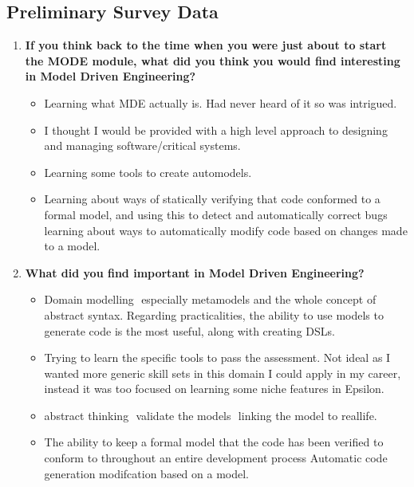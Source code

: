 \documentclass[12pt, a4paper]{report} \usepackage[titletoc]{appendix}
\begin{document}
\begin{appendices}
\chapter{Preliminary Survey Data}
\label{Preliminary Survey Data}

\begin{enumerate}
\item \textbf{If you think back to the time when you were just about to start the MODE module, what did you think you would find interesting in Model ­Driven Engineering?}
\begin{itemize}
\item Learning what MDE actually is. Had never heard of it so was intrigued.
\item I thought I would be provided with a high level approach to designing and managing software/critical systems.
\item Learning some tools to create auto­models.
\item Learning about ways of statically verifying that code conformed to a formal model, and using this to detect and automatically correct bugs learning about ways to automatically modify code based on changes made to a model.
\end{itemize}

\item \textbf{What did you find important in Model­ Driven Engineering?}
\begin{itemize}
\item Domain modelling ­ especially metamodels and the whole concept of abstract syntax. Regarding practicalities, the ability to use models to generate code is the most useful, along with creating DSLs.
\item Trying to learn the specific tools to pass the assessment. Not ideal as I wanted more generic
skill sets in this domain I could apply in my career, instead it was too focused on learning some niche features in Epsilon.
\item abstract thinking ­ validate the models ­ linking the model to real­life.
\item The ability to keep a formal model that the code has been verified to conform to throughout
an entire development process Automatic code generation modifcation based on a model.
\end{itemize}


\end{enumerate}
\end{appendices}
\end{document}
